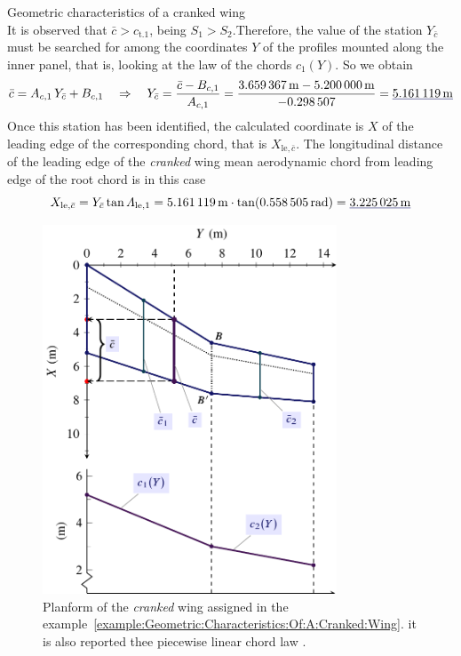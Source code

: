 \documentclass[[12pt,twoside]{book}
\begin{document}
\begin{myExampleX}{Geometric characteristics of a cranked wing}{}
\[\]
It is observed that $\bar{c} > c_{\mathrm{t}.1}$, being $S_1>S_2$.Therefore, the value of the station $Y_{\bar{c}}$ must be searched for among the coordinates $Y$ of the profiles mounted along the inner panel,  that is, looking at the law of the chords $c_1(Y)$. So we obtain
\[
\bar{c}=A_{c,1}\,Y_{\bar{c}} + B_{c,1} \quad \Rightarrow \quad
  Y_{\bar{c}} 
    = \frac{\bar{c} - B_{c,1}}{A_{c,1}}
    = \frac{
      \SI[round-precision=2]{\myMACWingCrankedMT}{\metre} 
        - \SI[round-precision=2]{\myCoeffBChordWingIMT}{\metre}
      }{
        \SI[round-precision=3]{\myCoeffAChordWingI}{}
      }
    = \mathunderline{mydarkblue}{
      \SI[round-precision=2]{\myYYMACWingCrankedMT}{\metre}
    }
\]
Once this station has been identified, the calculated coordinate is $X$ of the leading edge of the corresponding chord, that is $X_{\mathrm{le},\bar{c}}$.
The longitudinal distance of the leading edge of the \emph{cranked} wing mean aerodynamic chord  from leading edge of the root chord is in this case
\[
X_{\mathrm{le},\bar{c}} 
  = Y_{\bar{c}} \tan \Lambda_{\mathrm{le},1}
  = \SI[round-precision=2]{\myYYMACWingCrankedMT}{\metre}
    \cdot \tan( \SI[round-precision=3]{\mySweepLEWingIRAD}{\radian} )
  = \mathunderline{mydarkblue}{ \SI[round-precision=2]{\myXXMACLEToApexWingCrankedMT}{\metre} }
\]

\begin{figure}[t]%
    \includegraphics[width=0.78\textwidth]{Chapter_2/geometric_characteristics_of_a_cranked_wing/wing_planform_basic_2_drawing.pdf}%
  \caption{
           Planform of the  \emph{cranked} wing assigned in the example~\ref{example:Geometric:Characteristics:Of:A:Cranked:Wing}.
         it is also reported thee piecewise linear chord law .
  }
  \label{fig:Cranked:Wing:Planform:Results}%
\end{figure}
\end{myExampleX}
\end{document}
